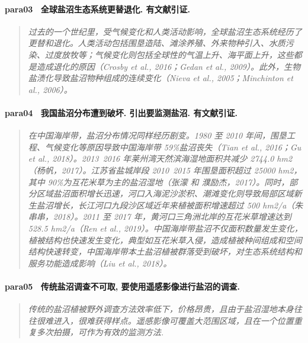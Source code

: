 \paragraph*{para03~
    \textcolor[RGB]{17, 205, 29}{全球盐沼生态系统更替退化. 有文献引证.}}
\begin{quotation}
    \itshape
    过去的一个世纪里，受气候变化和人类活动影响，全球盐沼生态系统经历了更替和退化。人类活动包括围垦造陆、滩涂养殖、外来物种引入、水质污染、过度放牧等；气候变化则包括全球性的气温上升、海平面上升，这些都是造成退化的原因（Crosby et al., 2016；Gedan et al., 2009）。此外，生物盐渍化导致盐沼物种组成的连续变化（Nieva et al., 2005；Minchinton et al., 2006）。 
\end{quotation}

\paragraph*{para04~
    \textcolor[RGB]{17, 205, 29}{我国盐沼分布遭到破坏. 引出要监测盐沼. 有文献引证. }}
\begin{quotation}
    \itshape
    在中国海岸带，盐沼分布情况同样经历剧变。1980 至 2010 年间，围垦工程、气候变化等原因导致中国海岸带 59\%盐沼丧失（Tian et al., 2016；Gu et al., 2018）。2013~2016 年莱州湾天然滨海湿地面积共减少 2744.0 hm2（杨帆，2017）。江苏省盐城岸段 2010~2015 年围垦面积超过 25000 hm2，其中 90\%为互花米草为主的盐沼湿地（张濛  和  濮励杰，2017）。同时，部分区域盐沼面积增长迅速，河口入海泥沙淤积、潮滩变化则导致局部区域新生盐沼增长，长江河口九段沙区域近年来植被面积增速超过 500 hm2/a（朱串串，2018）。2011 至 2017 年，黄河口三角洲北岸的互花米草增速达到 528.5 hm2/a（Ren et al., 2019）。中国海岸带盐沼不仅面积数量发生变化，植被结构也快速发生变化，典型如互花米草入侵，造成植被种间组成和空间结构快速转变，中国海岸带本土盐沼植被群落受到破坏，对生态系统结构和服务功能造成影响（Liu et al., 2018）。 

\end{quotation}

\paragraph*{para05~
    \textcolor[RGB]{17, 205, 29}{传统盐沼调查不可取, 要使用遥感影像进行盐沼的调查.}}
\begin{quotation}
    \itshape
    传统的盐沼植被野外调查方法效率低下，价格昂贵，且由于盐沼湿地本身往往很难进入，很难获得样点。遥感影像可覆盖大范围区域，且在一个位置重复多次拍摄，可作为有效的监测方法.
\end{quotation}

